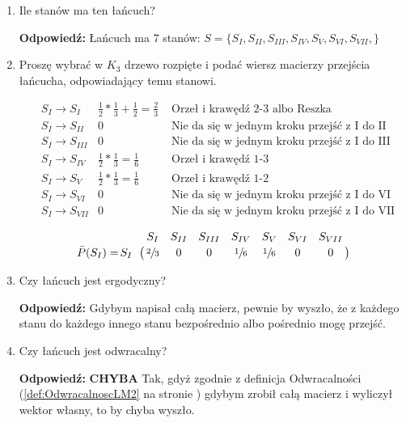 \documentclass[a4paper,12pt]{article}
\theoremstyle{definition}%
\theoremstyle{definition}
\theoremstyle{problem}
\let\bbordermatrix\bordermatrix
\begin{document}
\begin{enumerate}[label=\alph*)]
\item Ile stanów ma ten łańcuch?

\textbf{Odpowiedź:} Łańcuch ma 7 stanów: $S=\{S_{I},S_{II},S_{III},S_{IV},S_{V},S_{VI},S_{VII},\}$
\item Proszę wybrać w $K_3$ drzewo rozpięte i podać wiersz macierzy przejścia łańcucha, odpowiadający temu stanowi.

\begin{align*}
&S_{I}\rightarrow S_{I}   & \frac{1}{2}*\frac{1}{3}+\frac{1}{2}=\frac{2}{3} &\text{ Orzeł i krawędź 2-3 albo Reszka}\\
&S_{I}\rightarrow S_{II}  & 0 &\text{ Nie da się w jednym kroku przejść z I do II}\\
&S_{I}\rightarrow S_{III} & 0 &\text{ Nie da się w jednym kroku przejść z I do III}\\
&S_{I}\rightarrow S_{IV}  & \frac{1}{2}*\frac{1}{3}=\frac{1}{6} &\text{ Orzeł i krawędź 1-3}\\
&S_{I}\rightarrow S_{V}   & \frac{1}{2}*\frac{1}{3}=\frac{1}{6} &\text{ Orzeł i krawędź 1-2}\\
&S_{I}\rightarrow S_{VI}  & 0 &\text{ Nie da się w jednym kroku przejść z I do VI}\\
&S_{I}\rightarrow S_{VII} & 0 &\text{ Nie da się w jednym kroku przejść z I do VII}
\end{align*}

$$\bar{P}(S_I)=\bbordermatrix{&S_{I}&S_{II}&S_{III}&S_{IV}&S_{V}&S_{VI}&S_{VII} \cr
S_I& \sfrac{2}{3} &0&0&\sfrac{1}{6}&\sfrac{1}{6}&0&0}$$
\item Czy łańcuch jest ergodyczny?

\textbf{Odpowiedź: }Gdybym napisał całą macierz, pewnie by wyszło, że z każdego stanu do każdego innego stanu bezpośrednio albo pośrednio mogę przejść.
\item Czy łańcuch jest odwracalny?

\textbf{Odpowiedź: }\textbf{CHYBA }Tak, gdyż zgodnie z definicja Odwracalności (\ref{def:OdwracalnoscLM2} na stronie \pageref{def:OdwracalnoscLM2}) gdybym zrobił całą macierz i wyliczył wektor własny, to by chyba wyszło.
\end{enumerate}
\end{document}
